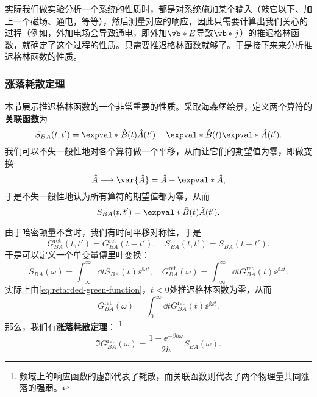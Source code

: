 实际我们做实验分析一个系统的性质时，都是对系统施加某个输入（敲它以下、加上一个磁场、通电，等等），然后测量对应的响应，因此只需要计算出我们关心的过程（例如，外加电场会导致通电，即外加$\vb*{E}$导致$\vb*{j}$）的推迟格林函数，就确定了这个过程的性质。只需要推迟格林函数就够了。于是接下来来分析推迟格林函数的性质。

\subsubsection{涨落耗散定理}

本节展示推迟格林函数的一个非常重要的性质。采取海森堡绘景，定义两个算符的\textbf{关联函数}为
\begin{equation}
    S_{BA}(t,t') = \expval*{\hat{B}(t)\hat{A}(t')} - \expval*{\hat{B}(t)}\expval*{\hat{A}(t')}.
\end{equation}
我们可以不失一般性地对各个算符做一个平移，从而让它们的期望值为零，即做变换
\[
    \hat{A} \longrightarrow \var{\hat{A}} = \hat{A} - \expval*{\hat{A}},
\]
于是不失一般性地认为所有算符的期望值都为零，从而
\begin{equation}
    S_{BA}(t,t') = \expval*{\hat{B}(t)\hat{A}(t')}.
\end{equation}

由于哈密顿量不含时，我们有时间平移对称性，于是
\begin{equation}
    G_{BA}^\text{ret}(t,t') = G_{BA}^\text{ret}(t-t'), \quad S_{BA}(t,t') = S_{BA}(t-t').
\end{equation}
于是可以定义一个单变量傅里叶变换：
\begin{equation}
    S_{BA}(\omega) = \int_{-\infty}^\infty \dd{t} S_{BA}(t) \ee^{\ii \omega t}, \quad G_{BA}^\text{ret}(\omega) = \int_{-\infty}^\infty \dd{t} G_{BA}^\text{ret}(t) \ee^{\ii \omega t}.
\end{equation}
实际上由\eqref{eq:retarded-green-function}，$t<0$处推迟格林函数为零，从而
\[
    G_{BA}^\text{ret}(\omega) = \int_0^\infty \dd{t} G_{BA}^\text{ret}(t) \ee^{\ii \omega t}.
\]
那么，我们有\textbf{涨落耗散定理}：%
\footnote{频域上的响应函数的虚部代表了耗散，而关联函数则代表了两个物理量共同涨落的强弱。}
\begin{equation}
    \Im G_{BA}^\text{ret}(\omega) = \frac{1 - \ee^{-\beta\hbar\omega}}{2\hbar} S_{BA}(\omega).
\end{equation}


